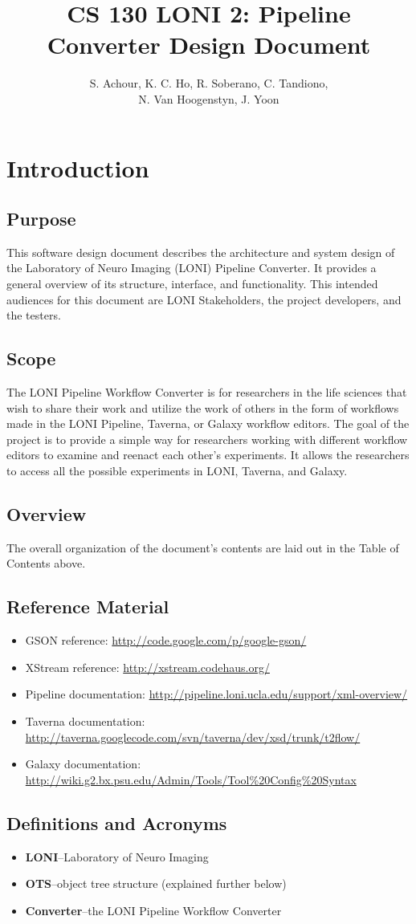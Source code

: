 \documentclass[12pt]{article}
\title{CS 130 LONI 2: Pipeline Converter Design Document}
\author{S. Achour, K. C. Ho, R. Soberano, C. Tandiono,\\ N. Van Hoogenstyn, J. Yoon}
\begin{document}
\maketitle
\tableofcontents
\section{Introduction}
\subsection{Purpose}
This software design document describes the architecture and system design of the Laboratory of Neuro Imaging (LONI) Pipeline Converter. It provides a general overview of its structure, interface, and functionality. This intended audiences for this document are LONI Stakeholders, the project developers, and the testers.

\subsection{Scope}

The LONI Pipeline Workflow Converter is for researchers in the life sciences that wish to share their work and utilize the work of others in the form of workflows made in the LONI Pipeline, Taverna, or Galaxy workflow editors. The goal of the project is to provide a simple way for researchers working with different workflow editors to examine and reenact each other's experiments. It allows the researchers to access all the possible experiments in LONI, Taverna, and Galaxy.

\subsection{Overview}

The overall organization of the document's contents are laid out in the Table of Contents above.        

\subsection{Reference Material}
\begin{itemize}
\item GSON reference: \url{http://code.google.com/p/google-gson/}
\item XStream reference: \url{http://xstream.codehaus.org/}
\item Pipeline documentation: \url{http://pipeline.loni.ucla.edu/support/xml-overview/}
\item Taverna documentation: \url{http://taverna.googlecode.com/svn/taverna/dev/xsd/trunk/t2flow/}
\item Galaxy documentation: \url{http://wiki.g2.bx.psu.edu/Admin/Tools/Tool\%20Config\%20Syntax}
\end{itemize}

\subsection{Definitions and Acronyms}
\begin{itemize}
\item \textbf{LONI}--Laboratory of Neuro Imaging
\item \textbf{OTS}--object tree structure (explained further below)
\item \textbf{Converter}--the LONI Pipeline Workflow Converter
\end{itemize}
\end{document}
